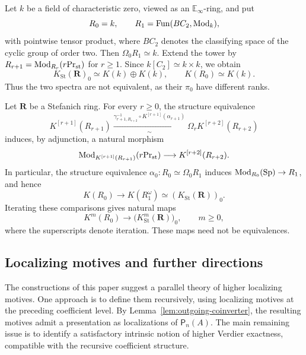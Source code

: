 \begin{example}\label{ex:nonmonogenic-stefanich-zero}


Let $k$ be a field of characteristic zero,
viewed as an $\mathbb E_\infty$-ring, and put
\[
 R_0=k,\qquad
 R_1=\operatorname{Fun}(BC_2,\operatorname{Mod}_k),
\]
with pointwise tensor product, where $BC_2$
denotes the classifying space of the cyclic
group of order two.
Then $\Omega_0R_1\simeq k$.
Extend the tower by
$R_{r+1}=\operatorname{Mod}_{R_r}({r}\mathrm{Pr}_{\mathrm{st}})$ for $r\geq1$.
Since $k[C_2]\simeq k\times k$, we obtain
\[
 K_{\mathrm{St}}(\mathbf R)_0
 \simeq K(k)\oplus K(k),
 \qquad
 K(R_0)\simeq K(k).
\]
Thus the two spectra are not equivalent,
as their $\pi_0$ have different ranks.
\end{example}



\begin{example}
Let $\mathbf R$ be a Stefanich ring.
For every $r\geq0$, the structure equivalence
\[
 K^{[r+1]}(R_{r+1})
 \xrightarrow[\sim]{
   \gamma_{r+1,R_{r+2}}^{-1}
   \circ K^{[r+1]}(\alpha_{r+1})}
 \Omega_rK^{[r+2]}(R_{r+2})
\]
induces, by adjunction, a natural morphism
\[
 \operatorname{Mod}_{K^{[r+1]}(R_{r+1})}({r}\mathrm{Pr}_{\mathrm{st}})
 \longrightarrow K^{[r+2]}(R_{r+2}).
\]
In particular, the structure equivalence
$\alpha_0:R_0\simeq\Omega_0R_1$ induces
$\operatorname{Mod}_{R_0}(\mathrm{Sp})\to R_1$, and hence
\[
 K(R_0)\longrightarrow K(R_1^\omega)
 \simeq(K_{\mathrm{St}}(\mathbf R))_0.
\]
Iterating these comparisons gives natural maps
\[
 K^m(R_0)\longrightarrow
 \bigl(K_{\mathrm{St}}^m(\mathbf R)\bigr)_0,
 \qquad m\geq0,
\]
where the superscripts denote iteration.
These maps need not be equivalences.
\end{example}







\subsection{Localizing motives and further directions}

The constructions of this paper suggest a parallel
theory of higher localizing motives. One approach
is to define them recursively, using localizing
motives at the preceding coefficient level.
By Lemma~\ref{lem:outgoing-coinverter},
the resulting
motives admit a presentation as localizations of
$\mathsf P_n(A)$. 
The main remaining issue is to
identify a satisfactory intrinsic notion of higher
Verdier exactness, compatible with the recursive
coefficient structure.

